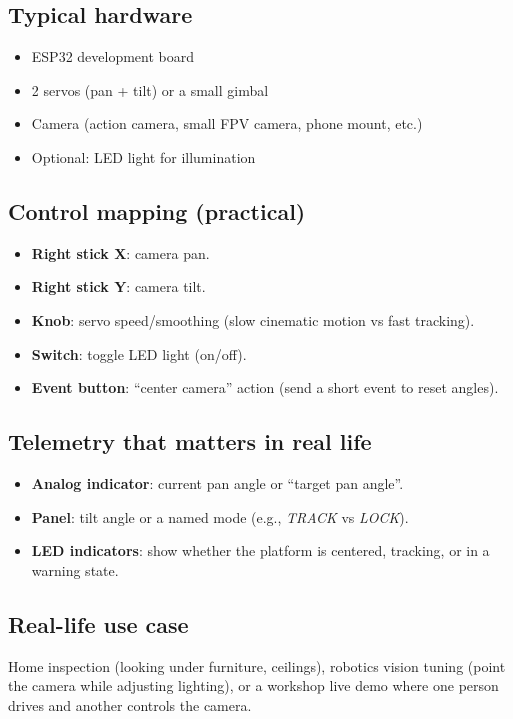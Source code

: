 \subsection*{Typical hardware}
\begin{itemize}
    \item ESP32 development board
    \item 2 servos (pan + tilt) or a small gimbal
    \item Camera (action camera, small FPV camera, phone mount, etc.)
    \item Optional: LED light for illumination
\end{itemize}

\subsection*{Control mapping (practical)}
\begin{itemize}
    \item \textbf{Right stick X}: camera pan.
    \item \textbf{Right stick Y}: camera tilt.
    \item \textbf{Knob}: servo speed/smoothing (slow cinematic motion vs fast tracking).
    \item \textbf{Switch}: toggle LED light (on/off).
    \item \textbf{Event button}: “center camera” action (send a short event to reset angles).
\end{itemize}

\subsection*{Telemetry that matters in real life}
\begin{itemize}
    \item \textbf{Analog indicator}: current pan angle or “target pan angle”.
    \item \textbf{Panel}: tilt angle or a named mode (e.g., \textit{TRACK} vs \textit{LOCK}).
    \item \textbf{LED indicators}: show whether the platform is centered, tracking, or in a warning state.
\end{itemize}

\subsection*{Real-life use case}
Home inspection (looking under furniture, ceilings), robotics vision tuning (point the camera while adjusting lighting), or a workshop live demo where one person drives and another controls the camera.

